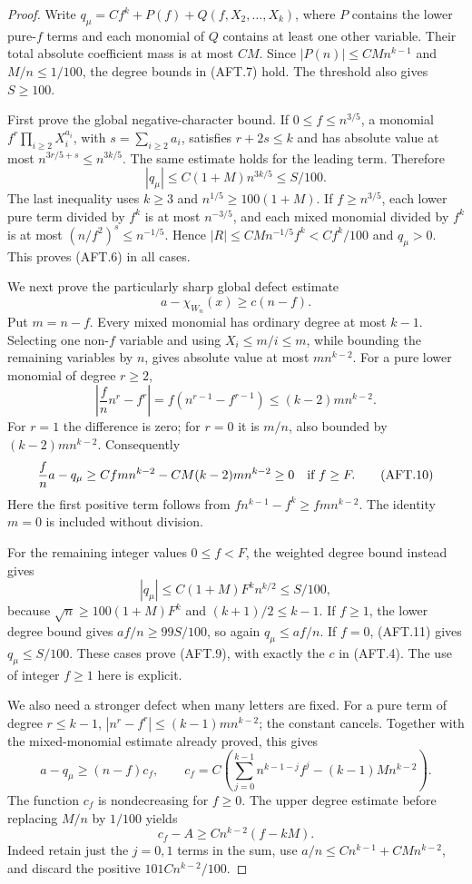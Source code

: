 \begin{proof}
Write $q_\mu=Cf^k+P(f)+Q(f,X_2,\ldots,X_k)$, where $P$
contains the lower pure-$f$ terms and each monomial of $Q$
contains at least one other variable. Their total absolute
coefficient mass is at most $CM$.
Since $|P(n)|\le CMn^{k-1}$ and $M/n\le1/100$, the degree
bounds in (AFT.7) hold. The threshold also gives $S\ge100$.

First prove the global negative-character bound. If
$0\le f\le n^{3/5}$, a monomial $f^r\prod_{i\ge2}X_i^{a_i}$,
with $s=\sum_{i\ge2}a_i$, satisfies $r+2s\le k$ and has
absolute value at most $n^{3r/5+s}\le n^{3k/5}$.
The same estimate holds for the leading term. Therefore
\[
 |q_\mu|\le C(1+M)n^{3k/5}\le S/100.                  \tag{AFT.8}
\]
The last inequality uses $k\ge3$ and
$n^{1/5}\ge100(1+M)$.
If $f\ge n^{3/5}$, each lower pure term divided by $f^k$
is at most $n^{-3/5}$, and each mixed monomial divided by
$f^k$ is at most
$(n/f^2)^s\le n^{-1/5}$. Hence
$|R|\le CMn^{-1/5}f^k<Cf^k/100$ and $q_\mu>0$.
This proves (AFT.6) in all cases.

We next prove the particularly sharp global defect estimate
\[
             a-\chi_{W_n}(x)\ge c(n-f).                \tag{AFT.9}
\]
Put $m=n-f$. Every mixed monomial has ordinary degree at
most $k-1$. Selecting one non-$f$ variable and using
$X_i\le m/i\le m$, while bounding the remaining variables
by $n$, gives absolute value at most $mn^{k-2}$.
For a pure lower monomial of degree $r\ge2$,
\[
 \left|\frac fn n^r-f^r\right|
 =f(n^{r-1}-f^{r-1})\le(k-2)mn^{k-2}.
\]
For $r=1$ the difference is zero; for $r=0$ it is $m/n$,
also bounded by $(k-2)mn^{k-2}$. Consequently
\[
 \frac fn a-q_\mu
 \ge Cfm n^{k-2}-CM(k-2)mn^{k-2}\ge0
 \quad\hbox{if }f\ge F.                               \tag{AFT.10}
\]
Here the first positive term follows from
$fn^{k-1}-f^k\ge fm n^{k-2}$. The identity $m=0$ is
included without division.

For the remaining integer values $0\le f<F$, the weighted
degree bound instead gives
\[
 |q_\mu|\le C(1+M)F^k n^{k/2}\le S/100,                \tag{AFT.11}
\]
because $\sqrt n\ge100(1+M)F^k$ and
$(k+1)/2\le k-1$. If $f\ge1$, the lower degree bound
gives $af/n\ge99S/100$, so again $q_\mu\le af/n$.
If $f=0$, (AFT.11) gives $q_\mu\le S/100$.
These cases prove (AFT.9), with exactly the $c$ in (AFT.4).
The use of integer $f\ge1$ here is explicit.

We also need a stronger defect when many letters are fixed.
For a pure term of degree $r\le k-1$,
$|n^r-f^r|\le(k-1)mn^{k-2}$; the constant cancels.
Together with the mixed-monomial estimate already proved,
this gives
\[
 a-q_\mu\ge (n-f)c_f,\qquad
 c_f=C\left(\sum_{j=0}^{k-1}n^{k-1-j}f^j
                  -(k-1)Mn^{k-2}\right).               \tag{AFT.12}
\]
The function $c_f$ is nondecreasing for $f\ge0$. The upper
degree estimate before replacing $M/n$ by $1/100$ yields
\[
                 c_f-A\ge Cn^{k-2}(f-kM).              \tag{AFT.13}
\]
Indeed retain just the $j=0,1$ terms in the sum, use
$a/n\le Cn^{k-1}+CMn^{k-2}$, and discard the positive
$101Cn^{k-2}/100$.


\end{proof}
